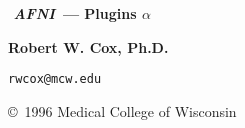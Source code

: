 \newcommand{\afni}{{\em AFNI\,}}
\newcommand{\afnit}{{\em AFNI\/}\ }

\newcommand{\MCW}{{\sf MCW}}

\newcommand{\mcwafni}{\MCW$\!$ \afnit}

\setlength{\topmargin}{0.0in}
\setlength{\textheight}{8.7in}
\setlength{\oddsidemargin}{0.25in}
\setlength{\evensidemargin}{0.25in}
\setlength{\textwidth}{6.5in}
\setlength{\footskip}{.7in}


\def\mypleft{\footnotesize \MCW$\!$ \afnit Plugins {\normalsize $\alpha$}}
\def\mypright{\scriptsize\today}
\dashpage

\raggedbottom

\newcommand{\seeme}[1]%
{\marginpar{\raggedright%
$\star\star\star$\hspace*{0pt plus 1fill}$\longrightarrow$\\{}%
\scriptsize\bf#1}}

\newcommand{\blob}{\hspace*{1em}}

\newcommand{\mysec}[1]{%
\vspace{2in}\goodbreak\vspace{-1.9in}\section{#1}}

\newcommand{\mysubsec}[1]{%
\vspace{1.1in}\goodbreak\vspace{-1.05in}\subsection{#1}}


\newcommand{\vset}{\vspace{0.5in}\goodbreak\vspace{-0.5in}}



\vspace*{0.4in}
\centerline{\Large\bf\boldmath \MCW$\!$ \afnit --- Plugins {\Large $\alpha$}}\vspace{1ex}
\centerline{\large\bf Robert W. Cox, Ph.D.}\vspace{0.4ex}
\centerline{\tt rwcox@mcw.edu}\vspace{0.2ex}
\centerline{\copyright\ 1996 Medical College of Wisconsin}

